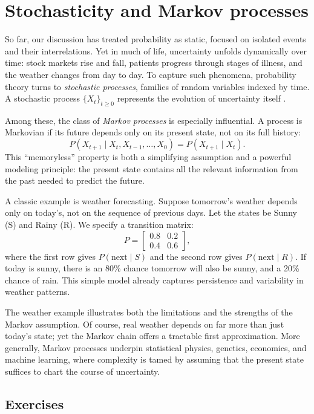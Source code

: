 \documentclass{book}
\begin{document}
\section{Stochasticity and Markov processes}

So far, our discussion has treated probability as static, focused on isolated events and their interrelations. Yet in much of life, uncertainty unfolds dynamically over time: stock markets rise and fall, patients progress through stages of illness, and the weather changes from day to day. To capture such phenomena, probability theory turns to \emph{stochastic processes}, families of random variables indexed by time. A stochastic process $\{X_t\}_{t \ge 0}$ represents the evolution of uncertainty itself \cite{doob1953stochastic}.

Among these, the class of \emph{Markov processes} is especially influential. A process is Markovian if its future depends only on its present state, not on its full history:
\[
P(X_{t+1} \mid X_t, X_{t-1}, \dots, X_0) = P(X_{t+1} \mid X_t) .
\]
This “memoryless” property is both a simplifying assumption and a powerful modeling principle: the present state contains all the relevant information from the past needed to predict the future.

A classic example is weather forecasting. Suppose tomorrow’s weather depends only on today’s, not on the sequence of previous days. Let the states be Sunny (S) and Rainy (R). We specify a transition matrix:
\[
P = 
\begin{bmatrix}
0.8 & 0.2 \\
0.4 & 0.6
\end{bmatrix},
\]
where the first row gives $P(\text{next} \mid S)$ and the second row gives $P(\text{next} \mid R)$. If today is sunny, there is an 80\% chance tomorrow will also be sunny, and a 20\% chance of rain. This simple model already captures persistence and variability in weather patterns.

The weather example illustrates both the limitations and the strengths of the Markov assumption. Of course, real weather depends on far more than just today’s state; yet the Markov chain offers a tractable first approximation. More generally, Markov processes underpin statistical physics, genetics, economics, and machine learning, where complexity is tamed by assuming that the present state suffices to chart the course of uncertainty.

\newpage

\subsection*{Exercises}
\end{document}
